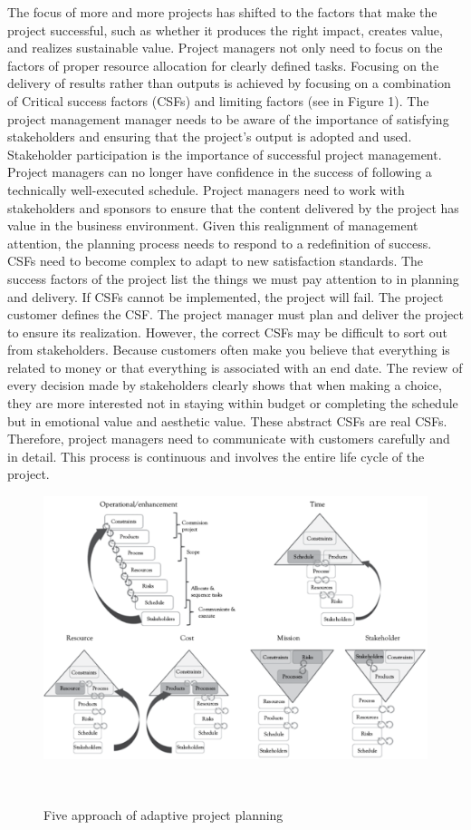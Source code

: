 \documentclass{sigchi}
\begin{document}
The focus of more and more projects has shifted to the factors that make the project successful, such as whether it produces the right impact, creates value, and realizes sustainable value. Project managers not only need to focus on the factors of proper resource allocation for clearly defined tasks. Focusing on the delivery of results rather than outputs is achieved by focusing on a combination of Critical success factors (CSFs) and limiting factors (see in Figure 1). The project management manager needs to be aware of the importance of satisfying stakeholders and ensuring that the project's output is adopted and used. Stakeholder participation is the importance of successful project management. Project managers can no longer have confidence in the success of following a technically well-executed schedule. Project managers need to work with stakeholders and sponsors to ensure that the content delivered by the project has value in the business environment. Given this realignment of management attention, the planning process needs to respond to a redefinition of success. CSFs need to become complex to adapt to new satisfaction standards. The success factors of the project list the things we must pay attention to in planning and delivery. If CSFs cannot be implemented, the project will fail. The project customer defines the CSF. The project manager must plan and deliver the project to ensure its realization. However, the correct CSFs may be difficult to sort out from stakeholders. Because customers often make you believe that everything is related to money or that everything is associated with an end date. The review of every decision made by stakeholders clearly shows that when making a choice, they are more interested not in staying within budget or completing the schedule but in emotional value and aesthetic value. These abstract CSFs are real CSFs. Therefore, project managers need to communicate with customers carefully and in detail. This process is continuous and involves the entire life cycle of the project.


\begin{figure}
\centering
  \includegraphics[width=0.9\columnwidth]{figures/approach}
  \caption{Five approach of adaptive project planning }~\label{fig:figure1}
\end{figure}
\end{document}
